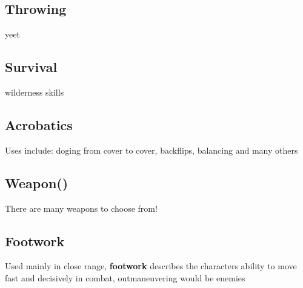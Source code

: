 \subsection{Throwing}\label{subsec:throwing}
yeet
\subsection{Survival}\label{subsec:survival}
wilderness skills
\subsection{Acrobatics}\label{subsec:acrobatics}
Uses include: doging from cover to cover, backflips, balancing and many others
\subsection{Weapon()}\label{subsec:weapon}
There are many weapons to choose from!
\subsection{Footwork}\label{subsec:footwork}
Used mainly in close range, \textbf{footwork} describes the characters ability to move fast and decisively in combat,
outmaneuvering would be enemies
